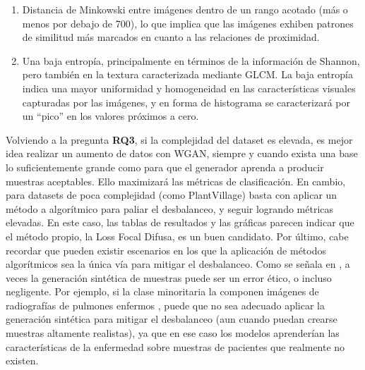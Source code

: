 \begin{enumerate}
    \fontsize{11pt}{12pt}\selectfont
    \item Distancia de Minkowski entre imágenes dentro de un rango acotado (más o menos por debajo de 700), lo que implica que 
    las imágenes exhiben patrones de similitud más marcados en cuanto a las relaciones de proximidad.
    
    \item Una baja entropía, principalmente en términos de la información de Shannon, pero también en la textura caracterizada mediante GLCM. La baja entropía indica una mayor uniformidad y homogeneidad en las características visuales capturadas por las imágenes, y en forma de histograma se caracterizará por un ``pico'' en los valores próximos a cero.
\end{enumerate}

Volviendo a la pregunta \textbf{RQ3}, si la complejidad del dataset es elevada, es mejor idea realizar un aumento de datos con WGAN, siempre y cuando exista una base lo suficientemente grande como para que el generador aprenda a producir muestras aceptables. Ello maximizará las métricas de clasificación. En cambio, para datasets de poca complejidad (como PlantVillage) basta con aplicar un método a algorítmico para paliar el desbalanceo, y seguir logrando métricas elevadas. En este caso, las tablas de resultados y las gráficas parecen indicar que el método propio, la Loss Focal Difusa, es un buen candidato.
Por último, cabe recordar que pueden existir escenarios en los que la aplicación de métodos algorítmicos sea la única vía para mitigar el desbalanceo. Como se señala en \citet{liu2022solving}, a veces la generación sintética de muestras puede ser un error ético, o incluso negligente. Por ejemplo, si la clase minoritaria la componen imágenes de radiografías de pulmones enfermos \cite{rahimzadeh2020modified,narayanan2020transfer}, puede que no sea adecuado aplicar la generación sintética para mitigar el desbalanceo (aun cuando puedan crearse muestras altamente realistas), ya que en ese caso los modelos aprenderían las características de la enfermedad sobre muestras de pacientes que realmente no existen.